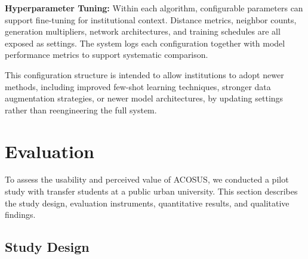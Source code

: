 \documentclass[letterpaper,11pt]{article}
\begin{document}
\textbf{Hyperparameter Tuning:} Within each algorithm, configurable parameters can support fine-tuning for institutional context. Distance metrics, neighbor counts, generation multipliers, network architectures, and training schedules are all exposed as settings. The system logs each configuration together with model performance metrics to support systematic comparison.

This configuration structure is intended to allow institutions to adopt newer methods, including improved few-shot learning techniques, stronger data augmentation strategies, or newer model architectures, by updating settings rather than reengineering the full system.

\section{Evaluation}\label{sec:evaluation}

To assess the usability and perceived value of ACOSUS, we conducted a pilot study with transfer students at a public urban university. This section describes the study design, evaluation instruments, quantitative results, and qualitative findings.

\subsection{Study Design}\label{subsec:studydesign}

\end{document}
